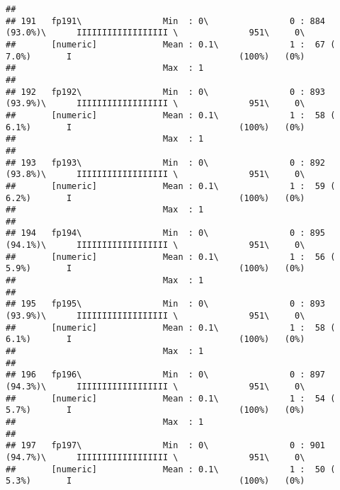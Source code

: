 \documentclass[]{article}
\begin{document}
\begin{verbatim}
## 
## 191   fp191\                Min  : 0\                0 : 884 (93.0%)\      IIIIIIIIIIIIIIIIII \              951\     0\       
##       [numeric]             Mean : 0.1\              1 :  67 ( 7.0%)       I                                 (100%)   (0%)     
##                             Max  : 1                                                                                           
## 
## 192   fp192\                Min  : 0\                0 : 893 (93.9%)\      IIIIIIIIIIIIIIIIII \              951\     0\       
##       [numeric]             Mean : 0.1\              1 :  58 ( 6.1%)       I                                 (100%)   (0%)     
##                             Max  : 1                                                                                           
## 
## 193   fp193\                Min  : 0\                0 : 892 (93.8%)\      IIIIIIIIIIIIIIIIII \              951\     0\       
##       [numeric]             Mean : 0.1\              1 :  59 ( 6.2%)       I                                 (100%)   (0%)     
##                             Max  : 1                                                                                           
## 
## 194   fp194\                Min  : 0\                0 : 895 (94.1%)\      IIIIIIIIIIIIIIIIII \              951\     0\       
##       [numeric]             Mean : 0.1\              1 :  56 ( 5.9%)       I                                 (100%)   (0%)     
##                             Max  : 1                                                                                           
## 
## 195   fp195\                Min  : 0\                0 : 893 (93.9%)\      IIIIIIIIIIIIIIIIII \              951\     0\       
##       [numeric]             Mean : 0.1\              1 :  58 ( 6.1%)       I                                 (100%)   (0%)     
##                             Max  : 1                                                                                           
## 
## 196   fp196\                Min  : 0\                0 : 897 (94.3%)\      IIIIIIIIIIIIIIIIII \              951\     0\       
##       [numeric]             Mean : 0.1\              1 :  54 ( 5.7%)       I                                 (100%)   (0%)     
##                             Max  : 1                                                                                           
## 
## 197   fp197\                Min  : 0\                0 : 901 (94.7%)\      IIIIIIIIIIIIIIIIII \              951\     0\       
##       [numeric]             Mean : 0.1\              1 :  50 ( 5.3%)       I                                 (100%)   (0%)     

\end{verbatim}
\end{document}
